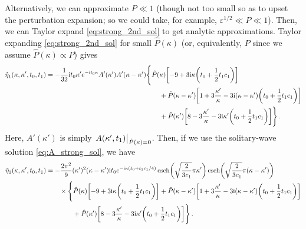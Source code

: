 \documentclass{jfm}
\newcommand{\GenPk}{\hat{P}(\kappa)}
\newcommand{\im}{\mathrm{i}}
\renewcommand*{\epsilon}{\varepsilon}
\begin{document}
Alternatively, we can approximate $P \ll 1$ (though not too small so as
to upset the perturbation expansion; so we could take, for example,
$\epsilon^{1/2} \ll P \ll 1$).
Then, we can Taylor expand \cref{eq:strong_2nd_sol} to get analytic
approximations.
Taylor expanding \cref{eq:strong_2nd_sol} for small $\GenPk$ (or,
equivalently, $P$ since we assume $\GenPk \propto P$) gives
\begin{equation}
  \begin{split}
  \hat{\eta}_1(\kappa,\kappa',t_0,t_1) = - \frac{1}{32} \im t_0 \kappa'
  e^{-\im t_0 \kappa} A'(\kappa') A'(\kappa-\kappa')
  & \Biggl\{
  \hat{P}(\kappa) \bqty{-9 + 3 \im \kappa \pqty{t_0 + \frac{1}{2} t_1 c_1}} \\
    &\qquad
  +\hat{P}(\kappa-\kappa') \bqty{1 + 3 \frac{\kappa'}{\kappa} - 3
    \im (\kappa-\kappa') \pqty{t_0 + \frac{1}{2} t_1 c_1} } \\
  &\qquad
  +\hat{P}(\kappa') \bqty{8 - 3 \frac{\kappa'}{\kappa} - 3 \im \kappa'
    \pqty{t_0 + \frac{1}{2} t_1 c_1}}
  \Biggr\}
  \,.
  \end{split}
  \label{eq:general_approx_sol}
\end{equation}
Here, $A'(\kappa')$ is simply $\eval{A(\kappa',t_1)}_{\GenPk = 0}$.
Then, if we use the solitary-wave solution \cref{eq:A_strong_sol}, we
have
\begin{equation}
  \begin{split}
  \hat{\eta}_1(\kappa,\kappa',t_0,t_1) &= -\frac{2 \pi^2}{9} (\kappa')^2 (\kappa-\kappa') \im t_0
    e^{-\im \kappa ( t_0 + t_1 c_1/4)}
    \csch( \sqrt{\frac{2}{3 c_1}} \pi \kappa')
    \csch( \sqrt{\frac{2}{3 c_1}} \pi (\kappa-\kappa')) \\
    &\qquad \times \Biggl\{
    \hat{P}(\kappa) \bqty{-9 + 3 \im \kappa \pqty{t_0 + \frac{1}{2} t_1 c_1}}
    +\hat{P}(\kappa-\kappa') \bqty{1 + 3 \frac{\kappa'}{\kappa} - 3 \im
      (\kappa-\kappa') \pqty{t_0 + \frac{1}{2} t_1 c_1}} \\
    &\qquad\qquad
    +\hat{P}(\kappa') \bqty{8 - 3 \frac{\kappa'}{\kappa} - 3 \im \kappa'
      \pqty{t_0 + \frac{1}{2} t_1 c_1}}
  \Biggr\}
  \,.
  \end{split}
  \label{eq:solitary_approx_sol}
\end{equation}
\end{document}
